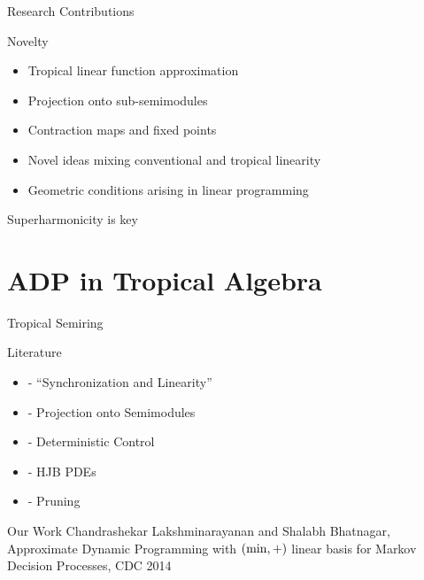 \documentclass[10pt,handout]{beamer}
\begin{document}
\begin{frame}[fragile]{Research Contributions}
\begin{block}{Novelty}
\begin{itemize}
\item Tropical linear function approximation
\item Projection onto sub-semimodules
\item Contraction maps and fixed points
\item Novel ideas mixing conventional and tropical linearity
\item Geometric conditions arising in linear programming
\end{itemize}
\end{block}
\begin{block}{Superharmonicity is key}
\end{block}
\end{frame}

\section{ADP in Tropical Algebra}


\begin{frame}[fragile]{Tropical Semiring}
\begin{block}{Literature}
\begin{itemize}
\item \cite{baccelli1994synchronization} - ``Synchronization and Linearity''
\item \cite{cohen1996kernels} - Projection onto Semimodules
\item \cite{akian2008max} - Deterministic Control
\item \cite{mceneaney2008curse,mceneaney2009convergence} - HJB PDEs
\item \cite{gaubert2011curse} - Pruning
\end{itemize}

\end{block}
\begin{block}{Our Work}
Chandrashekar Lakshminarayanan and Shalabh Bhatnagar, Approximate Dynamic Programming with $(\min,+)$ linear basis for Markov Decision Processes, CDC 2014
\end{block}
\end{frame}
\end{document}
